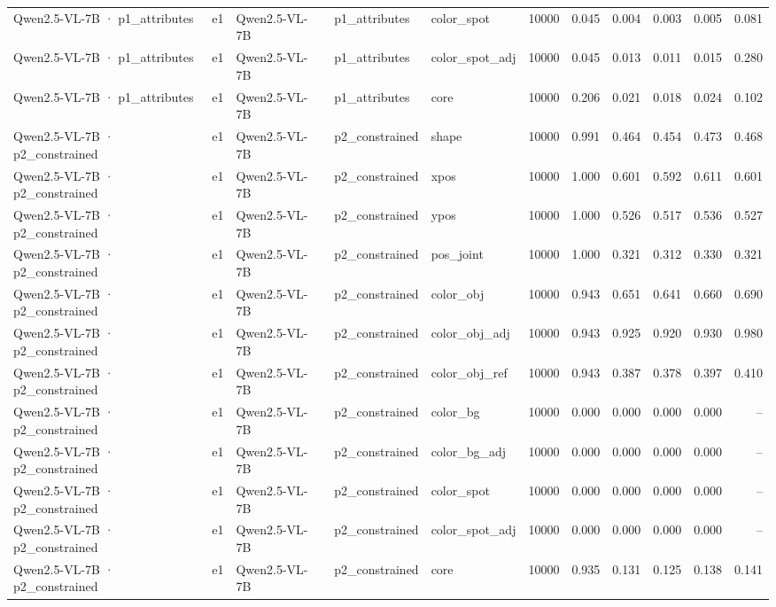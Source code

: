 \begin{tabular}{lllllrrrrrr}
Qwen2.5-VL-7B · p1\_attributes & e1 & Qwen2.5-VL-7B & p1\_attributes & color\_spot & 10000 & 0.045 & 0.004 & 0.003 & 0.005 & 0.081 \\
Qwen2.5-VL-7B · p1\_attributes & e1 & Qwen2.5-VL-7B & p1\_attributes & color\_spot\_adj & 10000 & 0.045 & 0.013 & 0.011 & 0.015 & 0.280 \\
Qwen2.5-VL-7B · p1\_attributes & e1 & Qwen2.5-VL-7B & p1\_attributes & core & 10000 & 0.206 & 0.021 & 0.018 & 0.024 & 0.102 \\
Qwen2.5-VL-7B · p2\_constrained & e1 & Qwen2.5-VL-7B & p2\_constrained & shape & 10000 & 0.991 & 0.464 & 0.454 & 0.473 & 0.468 \\
Qwen2.5-VL-7B · p2\_constrained & e1 & Qwen2.5-VL-7B & p2\_constrained & xpos & 10000 & 1.000 & 0.601 & 0.592 & 0.611 & 0.601 \\
Qwen2.5-VL-7B · p2\_constrained & e1 & Qwen2.5-VL-7B & p2\_constrained & ypos & 10000 & 1.000 & 0.526 & 0.517 & 0.536 & 0.527 \\
Qwen2.5-VL-7B · p2\_constrained & e1 & Qwen2.5-VL-7B & p2\_constrained & pos\_joint & 10000 & 1.000 & 0.321 & 0.312 & 0.330 & 0.321 \\
Qwen2.5-VL-7B · p2\_constrained & e1 & Qwen2.5-VL-7B & p2\_constrained & color\_obj & 10000 & 0.943 & 0.651 & 0.641 & 0.660 & 0.690 \\
Qwen2.5-VL-7B · p2\_constrained & e1 & Qwen2.5-VL-7B & p2\_constrained & color\_obj\_adj & 10000 & 0.943 & 0.925 & 0.920 & 0.930 & 0.980 \\
Qwen2.5-VL-7B · p2\_constrained & e1 & Qwen2.5-VL-7B & p2\_constrained & color\_obj\_ref & 10000 & 0.943 & 0.387 & 0.378 & 0.397 & 0.410 \\
Qwen2.5-VL-7B · p2\_constrained & e1 & Qwen2.5-VL-7B & p2\_constrained & color\_bg & 10000 & 0.000 & 0.000 & 0.000 & 0.000 & -- \\
Qwen2.5-VL-7B · p2\_constrained & e1 & Qwen2.5-VL-7B & p2\_constrained & color\_bg\_adj & 10000 & 0.000 & 0.000 & 0.000 & 0.000 & -- \\
Qwen2.5-VL-7B · p2\_constrained & e1 & Qwen2.5-VL-7B & p2\_constrained & color\_spot & 10000 & 0.000 & 0.000 & 0.000 & 0.000 & -- \\
Qwen2.5-VL-7B · p2\_constrained & e1 & Qwen2.5-VL-7B & p2\_constrained & color\_spot\_adj & 10000 & 0.000 & 0.000 & 0.000 & 0.000 & -- \\
Qwen2.5-VL-7B · p2\_constrained & e1 & Qwen2.5-VL-7B & p2\_constrained & core & 10000 & 0.935 & 0.131 & 0.125 & 0.138 & 0.141 \\

\end{tabular}
